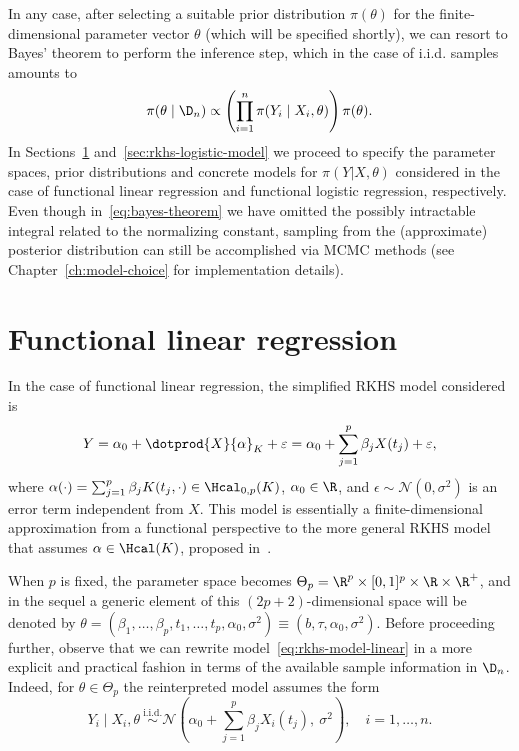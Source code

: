 In any case, after selecting a suitable prior distribution \(\pi(\theta)\) for the finite-dimensional parameter vector \(\theta\) (which will be specified shortly), we can resort to Bayes' theorem to perform the inference step, which in the case of i.i.d. samples amounts to
\begin{equation}\label{eq:bayes-theorem}
  \pi(\theta \mid \D_n) \propto \left( \prod_{i=1}^n \pi(Y_i\mid X_i, \theta) \right)\pi(\theta).
\end{equation}
In Sections~\ref{sec:rkhs-linear-model} and~\ref{sec:rkhs-logistic-model} we proceed to specify the parameter spaces, prior distributions and concrete models for \(\pi(Y | X,\theta)\) considered in the case of functional linear regression and functional logistic regression, respectively. Even though in~\eqref{eq:bayes-theorem} we have omitted the possibly intractable integral related to the normalizing constant, sampling from the (approximate) posterior distribution can still be accomplished via MCMC methods (see Chapter~\ref{ch:model-choice} for implementation details).

\section{Functional linear regression}\label{sec:rkhs-linear-model}

In the case of functional linear regression, the simplified RKHS model considered is
\begin{equation}\label{eq:rkhs-model-linear}
  Y = \alpha_0 + \dotprod{X}{\alpha}_K + \epsilon = \alpha_0 + \sum_{j=1}^p \beta_j X(t_j) + \epsilon,
\end{equation}
where \(\alpha(\cdot) = \sum_{j=1}^p \beta_j K(t_j, \cdot) \in \Hcal_{0,p}(K)\), \(\alpha_0\in\R\), and \(\epsilon \sim \mathcal N(0, \sigma^2)\) is an error term independent from \(X\). This model is essentially a finite-dimensional approximation from a functional perspective to the more general RKHS model that assumes \(\alpha \in \Hcal(K)\), proposed in~\citet{berrendero2019rkhs}.

When \(p\) is fixed, the parameter space becomes \(\Theta_p = \R^p \times [0, 1]^p \times \R \times \R^+\), and in the sequel a generic element of this \((2p+2)\)-dimensional space will be denoted by \(\theta = (\beta_1,\dots, \beta_p, t_1,\dots, t_p, \alpha_0, \sigma^2) \equiv (b, \tau, \alpha_0, \sigma^2)\). Before proceeding further, observe that we can rewrite model~\eqref{eq:rkhs-model-linear} in a more explicit and practical fashion in terms of the available sample information in \(\D_n\). Indeed, for \(\theta \in \Theta_p\) the reinterpreted model assumes the form
\begin{equation}\label{eq:rkhs-model-linear-2}
  Y_i \mid X_i, \theta \ \stackrel{\text{i.i.d.}}{\sim} \mathcal N\left(\alpha_0 + \sum_{j=1}^p \beta_j X_i(t_j), \ \sigma^2\right), \quad i =1,\dots, n.
\end{equation}

